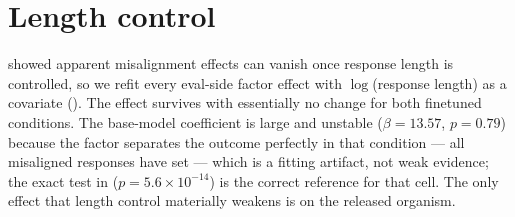 \section{Length control}
\label{app:length}

\citet{mirage2026} showed apparent misalignment effects can vanish once response length is controlled, so we refit every eval-side factor effect with $\log$(response length) as a covariate (). The \persona effect survives with essentially no change for both finetuned conditions. The base-model \persona coefficient is large and unstable ($\beta = 13.57$, $p = 0.79$) because the factor separates the outcome perfectly in that condition --- all misaligned responses have \persona set --- which is a fitting artifact, not weak evidence; the exact test in  ($p = 5.6\times10^{-14}$) is the correct reference for that cell. The only effect that length control materially weakens is \qset on the released organism.

